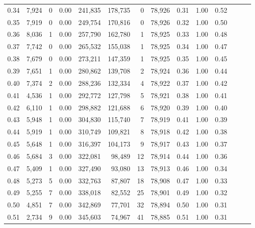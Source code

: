 \begin{tabular}{rrrrrrrrrrrrrr}
0.34 &   7,924 &      0 &  0.00 &  241,835 &  178,735 &       0 &  78,926 &  0.31 &  1.00 &      0.52 \\
0.35 &   7,919 &      0 &  0.00 &  249,754 &  170,816 &       0 &  78,926 &  0.32 &  1.00 &      0.50 \\
0.36 &   8,036 &      1 &  0.00 &  257,790 &  162,780 &       1 &  78,925 &  0.33 &  1.00 &      0.48 \\
0.37 &   7,742 &      0 &  0.00 &  265,532 &  155,038 &       1 &  78,925 &  0.34 &  1.00 &      0.47 \\
0.38 &   7,679 &      0 &  0.00 &  273,211 &  147,359 &       1 &  78,925 &  0.35 &  1.00 &      0.45 \\
0.39 &   7,651 &      1 &  0.00 &  280,862 &  139,708 &       2 &  78,924 &  0.36 &  1.00 &      0.44 \\
0.40 &   7,374 &      2 &  0.00 &  288,236 &  132,334 &       4 &  78,922 &  0.37 &  1.00 &      0.42 \\
0.41 &   4,536 &      1 &  0.00 &  292,772 &  127,798 &       5 &  78,921 &  0.38 &  1.00 &      0.41 \\
0.42 &   6,110 &      1 &  0.00 &  298,882 &  121,688 &       6 &  78,920 &  0.39 &  1.00 &      0.40 \\
0.43 &   5,948 &      1 &  0.00 &  304,830 &  115,740 &       7 &  78,919 &  0.41 &  1.00 &      0.39 \\
0.44 &   5,919 &      1 &  0.00 &  310,749 &  109,821 &       8 &  78,918 &  0.42 &  1.00 &      0.38 \\
0.45 &   5,648 &      1 &  0.00 &  316,397 &  104,173 &       9 &  78,917 &  0.43 &  1.00 &      0.37 \\
0.46 &   5,684 &      3 &  0.00 &  322,081 &   98,489 &      12 &  78,914 &  0.44 &  1.00 &      0.36 \\
0.47 &   5,409 &      1 &  0.00 &  327,490 &   93,080 &      13 &  78,913 &  0.46 &  1.00 &      0.34 \\
0.48 &   5,273 &      5 &  0.00 &  332,763 &   87,807 &      18 &  78,908 &  0.47 &  1.00 &      0.33 \\
0.49 &   5,255 &      7 &  0.00 &  338,018 &   82,552 &      25 &  78,901 &  0.49 &  1.00 &      0.32 \\
0.50 &   4,851 &      7 &  0.00 &  342,869 &   77,701 &      32 &  78,894 &  0.50 &  1.00 &      0.31 \\
0.51 &   2,734 &      9 &  0.00 &  345,603 &   74,967 &      41 &  78,885 &  0.51 &  1.00 &      0.31 \\

\end{tabular}
